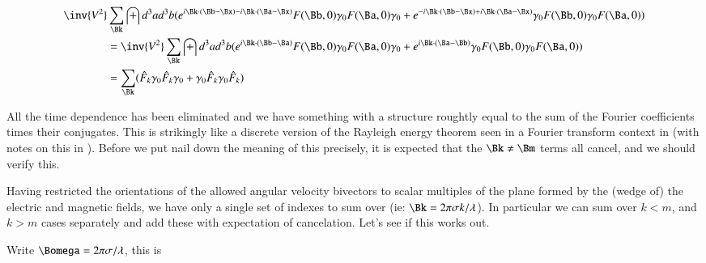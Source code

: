 \documentclass{article}
\begin{document}
\begin{align*}
\inv{V^2} &\sum_{\Bk} \int d^3 a d^3 b (e^{   i \Bk \cdot (\Bb-\Bx) - i \Bk \cdot (\Ba-\Bx) } F(\Bb, 0) \gamma_0 F(\Ba, 0) \gamma_0  
+e^{ - i \Bk \cdot (\Bb-\Bx) + i \Bk \cdot (\Ba-\Bx) } \gamma_0 F(\Bb, 0) \gamma_0 F(\Ba, 0)) \\
&=
\inv{V^2} \sum_{\Bk} \int d^3 a d^3 b (e^{   i \Bk \cdot (\Bb - \Ba) } F(\Bb, 0) \gamma_0 F(\Ba, 0) \gamma_0  
+e^{ i \Bk \cdot (\Ba -\Bb) } \gamma_0 F(\Bb, 0) \gamma_0 F(\Ba, 0)) \\
&=
\sum_{\Bk} ( \hat{F}_k \gamma_0 \hat{F}_k \gamma_0 + \gamma_0 \hat{F}_k \gamma_0 \hat{F}_k ) \\
\end{align*}

All the time dependence has been eliminated and we have something with a structure roughtly equal to the sum of the Fourier coefficients 
times their conjugates.  This is strikingly like a discrete version of the Rayleigh energy theorem seen in 
a Fourier transform context in \cite{haykin1994cs} (with notes on this in \cite{PJqmFourier}).
Before we put nail down the meaning of this precisely, it is expected that 
the $\Bk \ne \Bm$ terms all cancel, and we should verify this.

Having restricted the orientations of the allowed angular velocity bivectors to scalar multiples of the plane formed by the (wedge of) the electric 
and magnetic fields, we have only a single set of indexes to sum over (ie: $\Bk = 2 \pi \sigma k/ \lambda$).
In particular we can sum over $k < m$, and $k > m$ cases separately and add these
with expectation of cancelation.  Let's see if this works out.

Write $\Bomega = 2 \pi \sigma / \lambda$, this is
\end{document}
